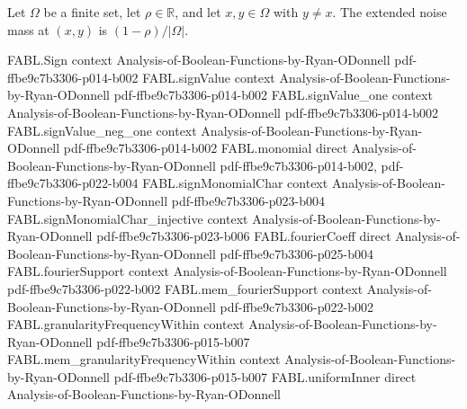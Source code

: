 \begin{theorem}
\label{FABL.uniformExtendedNoiseMass_of_ne}
\leanok
{}
Let $\Omega$ be a finite set, let $\rho\in\mathbb{R}$, and let $x,y\in\Omega$ with $y\ne
x$. The extended noise mass at $(x,y)$ is $(1-\rho)/|\Omega|$.
\end{theorem}

\begin{theorem}
\label{FABL.uniformExtendedNoiseMass_lowerEndpoint}
\leanok
{}
\proofstep
  {FABL.Sign}
  {context}
  {Analysis-of-Boolean-Functions-by-Ryan-ODonnell}
  {pdf-ffbe9c7b3306-p014-b002}
\proofstep
  {FABL.signValue}
  {context}
  {Analysis-of-Boolean-Functions-by-Ryan-ODonnell}
  {pdf-ffbe9c7b3306-p014-b002}
\proofstep
  {FABL.signValue_one}
  {context}
  {Analysis-of-Boolean-Functions-by-Ryan-ODonnell}
  {pdf-ffbe9c7b3306-p014-b002}
\proofstep
  {FABL.signValue_neg_one}
  {context}
  {Analysis-of-Boolean-Functions-by-Ryan-ODonnell}
  {pdf-ffbe9c7b3306-p014-b002}
\proofstep
  {FABL.monomial}
  {direct}
  {Analysis-of-Boolean-Functions-by-Ryan-ODonnell}
  {pdf-ffbe9c7b3306-p014-b002,
    pdf-ffbe9c7b3306-p022-b004}
\proofstep
  {FABL.signMonomialChar}
  {context}
  {Analysis-of-Boolean-Functions-by-Ryan-ODonnell}
  {pdf-ffbe9c7b3306-p023-b004}
\proofstep
  {FABL.signMonomialChar_injective}
  {context}
  {Analysis-of-Boolean-Functions-by-Ryan-ODonnell}
  {pdf-ffbe9c7b3306-p023-b006}
\proofstep
  {FABL.fourierCoeff}
  {direct}
  {Analysis-of-Boolean-Functions-by-Ryan-ODonnell}
  {pdf-ffbe9c7b3306-p025-b004}
\proofstep
  {FABL.fourierSupport}
  {context}
  {Analysis-of-Boolean-Functions-by-Ryan-ODonnell}
  {pdf-ffbe9c7b3306-p022-b002}
\proofstep
  {FABL.mem_fourierSupport}
  {context}
  {Analysis-of-Boolean-Functions-by-Ryan-ODonnell}
  {pdf-ffbe9c7b3306-p022-b002}
\proofstep
  {FABL.granularityFrequencyWithin}
  {context}
  {Analysis-of-Boolean-Functions-by-Ryan-ODonnell}
  {pdf-ffbe9c7b3306-p015-b007}
\proofstep
  {FABL.mem_granularityFrequencyWithin}
  {context}
  {Analysis-of-Boolean-Functions-by-Ryan-ODonnell}
  {pdf-ffbe9c7b3306-p015-b007}
\proofstep
  {FABL.uniformInner}
  {direct}
  {Analysis-of-Boolean-Functions-by-Ryan-ODonnell}

\end{theorem}
